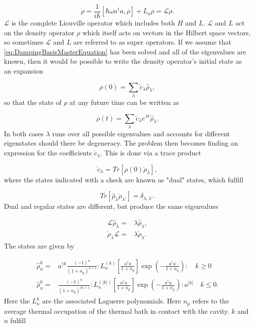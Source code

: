 \documentclass[12pt]{article}
\begin{document}
\begin{equation}\label{eq:DampingBasisMasterEquation}
    \dot{\rho} = \frac{1}{i\hbar}[\hbar \omega a^\dagger a,\rho] +L_a\rho = \mathcal{L}\rho.
\end{equation} $\mathcal{L}$ is the complete Liouville operator which includes both $H$ and $L$. $\mathcal{L}$ and $L$ act on the density operator $\rho$ which itself acts on vectors in the Hilbert space vectors, so sometimes $\mathcal{L}$ and $L$ are referred to as super operators. If we assume that \ref{eq:DampingBasisMasterEquation} has been solved and all of the eigenvalues are known, then it would be possible to write the density operator's initial state as an expansion

\begin{equation}
    \rho(0) = \sum_{\lambda} \check{c}_{\lambda} \hat{\rho}_{\lambda}, 
\end{equation} so that the state of $\rho$ at any future time can be written as

\begin{equation}
    \rho(t) = \sum_{\lambda} \check{c}_{\lambda} e^{\lambda t}\hat{\rho}_{\lambda}. 
\end{equation} In both cases $\lambda$ runs over all possible eigenvalues and accounts for different eigenstates should there be degeneracy. The problem then becomes finding an expression for the coefficients $\check{c}_{\lambda}$. This is done via a trace product

\begin{equation}
    \check{c}_\lambda = Tr[\rho(0)\check{\rho}_\lambda],
\end{equation} where the states indicated with a check are known as "dual" states, which fulfill

\begin{equation}
    Tr[\hat{\rho}_{\lambda} \check{\rho}_{\lambda'}] = \delta_{\lambda,\lambda'}. 
\end{equation} Dual and regular states are different, but produce the same eigenvalues

\begin{align}
    \mathcal{L}\hat{\rho}_\lambda =& \lambda \hat{\rho}_\lambda, \\
    \check{\rho}_\lambda\mathcal{L} =& \lambda \check{\rho}_\lambda.
\end{align} The states are given by

\begin{align}
  \hat{\rho}_n^k=& a^{\dagger k} \frac{(-1)^{n}}{(1+n_p)^{k+1}}: L_{n}^{(k)}\left[\frac{a^{\dagger} a}{1+n_p}\right] \exp \left(-\frac{a^{\dagger} a}{1+n_p}\right):  \quad k \geq 0 \nonumber\\
    \hat{\rho}_n^k=& \frac{(-1)^{n}}{(1+n_p)^{|k|+1}}: L_{n}^{(|k|)}\left[\frac{a^{\dagger} a}{1+n_p}\right] \exp \left(-\frac{a^{\dagger} a}{1+n_p}\right): a^{|k|}  \quad k \leq 0 . \nonumber
\end{align} Here the $L_n^k$ are the associated Laguerre polynomials. Here $n_p$ refers to the average thermal occupation of the thermal bath in contact with the cavity. $k$ and $n$ fulfill
\end{document}
